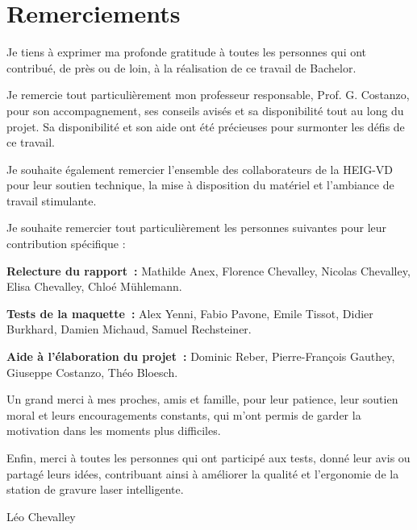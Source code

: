\chapter*{Remerciements}

Je tiens à exprimer ma profonde gratitude à toutes les personnes qui ont contribué, de près ou de loin, à la réalisation de ce travail de Bachelor.

Je remercie tout particulièrement mon professeur responsable, Prof. G. Costanzo, pour son accompagnement, ses conseils avisés et sa disponibilité tout au long du projet. Sa disponibilité et son aide ont été précieuses pour surmonter les défis de ce travail.

Je souhaite également remercier l’ensemble des collaborateurs de la HEIG-VD pour leur soutien technique, la mise à disposition du matériel et l’ambiance de travail stimulante.

Je souhaite remercier tout particulièrement les personnes suivantes pour leur contribution spécifique :

\textbf{Relecture du rapport~:} Mathilde Anex, Florence Chevalley, Nicolas Chevalley, Elisa Chevalley, Chloé Mühlemann.

\textbf{Tests de la maquette~:} Alex Yenni, Fabio Pavone, Emile Tissot, Didier Burkhard, Damien Michaud, Samuel Rechsteiner.

\textbf{Aide à l'élaboration du projet~:} Dominic Reber, Pierre-François Gauthey, Giuseppe Costanzo, Théo Bloesch.

Un grand merci à mes proches, amis et famille, pour leur patience, leur soutien moral et leurs encouragements constants, qui m’ont permis de garder la motivation dans les moments plus difficiles.

Enfin, merci à toutes les personnes qui ont participé aux tests, donné leur avis ou partagé leurs idées, contribuant ainsi à améliorer la qualité et l’ergonomie de la station de gravure laser intelligente.

\vspace{1cm}
\begin{flushright}
    Léo Chevalley
\end{flushright}

